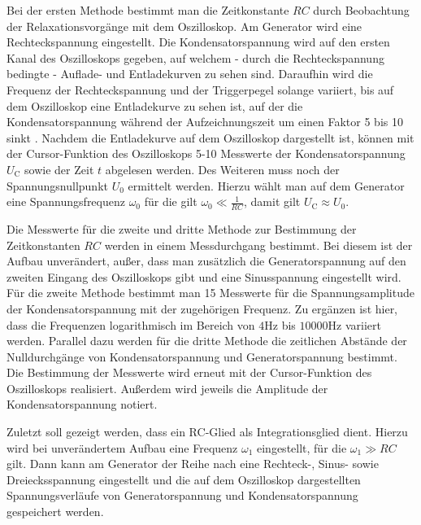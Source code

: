 Bei der ersten Methode bestimmt man die Zeitkonstante $RC$ durch Beobachtung der Relaxationsvorgänge mit dem Oszilloskop.
Am Generator wird eine Rechteckspannung eingestellt.
Die Kondensatorspannung wird auf den ersten Kanal des Oszilloskops gegeben, auf welchem - durch
die Rechteckspannung bedingte - Auflade- und Entladekurven zu sehen sind.
Daraufhin wird die Frequenz der Rechteckspannung und der Triggerpegel solange variiert, bis
auf dem Oszilloskop eine Entladekurve zu sehen ist, auf der die Kondensatorspannung während der
Aufzeichnungszeit um einen Faktor 5 bis 10 sinkt \cite{Anleitung}.
Nachdem die Entladekurve auf dem Oszilloskop dargestellt ist, können mit der Cursor-Funktion
des Oszilloskops 5-10 Messwerte der Kondensatorspannung $U_{\text{C}}$ sowie der Zeit $t$
abgelesen werden.
Des Weiteren muss noch der Spannungsnullpunkt $U_0$ ermittelt werden.
Hierzu wählt man auf dem Generator eine Spannungsfrequenz $\omega_0$ für die gilt
$\omega_0 \ll \frac{1}{RC}$, damit gilt $U_{\text{C}} \approx U_0$.


Die Messwerte für die zweite und dritte Methode zur Bestimmung der Zeitkonstanten $RC$ werden
in einem Messdurchgang bestimmt.
Bei diesem ist der Aufbau unverändert, außer, dass man zusätzlich die Generatorspannung auf den zweiten Eingang des Oszilloskops gibt und eine Sinusspannung eingestellt wird.
Für die zweite Methode bestimmt man 15 Messwerte für die Spannungsamplitude der Kondensatorspannung mit der zugehörigen Frequenz. Zu ergänzen ist hier, dass die Frequenzen logarithmisch im Bereich von $4 \si{\Hz}$ bis $10000 \si{\Hz}$ variiert werden.
Parallel dazu %
werden für die dritte Methode die zeitlichen Abstände der Nulldurchgänge von Kondensatorspannung und Generatorspannung bestimmt.
Die Bestimmung der Messwerte wird erneut mit der Cursor-Funktion des Oszilloskops realisiert.
Außerdem wird jeweils die Amplitude der Kondensatorspannung notiert.

Zuletzt soll gezeigt werden, dass ein RC-Glied als Integrationsglied dient.
Hierzu wird bei unverändertem Aufbau eine Frequenz $\omega_1$ eingestellt, für die $\omega_1 \gg RC$ gilt. Dann kann am Generator der Reihe nach eine Rechteck-, Sinus- sowie Dreiecksspannung eingestellt und die auf dem Oszilloskop dargestellten Spannungsverläufe von Generatorspannung und Kondensatorspannung gespeichert werden.
